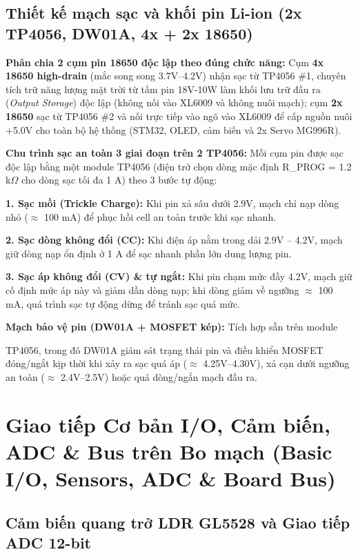 \documentclass[12pt,a4paper]{report}
\begin{document}
\subsection{Thiết kế mạch sạc và khối pin Li-ion (2x TP4056, DW01A, 4x + 2x 18650)}

\textbf{Phân chia 2 cụm pin 18650 độc lập theo đúng chức năng:} Cụm \textbf{4x 18650 high-drain} (mắc song song 3.7V--4.2V) nhận sạc từ TP4056 \#1, chuyên tích trữ năng lượng mặt trời từ tấm pin 18V-10W làm khối lưu trữ đầu ra (\textit{Output Storage}) độc lập (không nối vào XL6009 và không nuôi mạch); cụm \textbf{2x 18650} sạc từ TP4056 \#2 và nối trực tiếp vào ngõ vào XL6009 để cấp nguồn nuôi +5.0V cho toàn bộ hệ thống (STM32, OLED, cảm biến và 2x Servo MG996R).

\textbf{Chu trình sạc an toàn 3 giai đoạn trên 2\texttimes{} TP4056:} Mỗi cụm pin được sạc độc lập bằng một module TP4056 (điện trở chọn dòng mặc định R\_PROG = 1.2 k\ensuremath{\Omega} cho dòng sạc tối đa 1 A) theo 3 bước tự động:

\textbf{1. Sạc mồi (Trickle Charge):} Khi pin xả sâu dưới 2.9V, mạch chỉ nạp dòng nhỏ (\ensuremath{\approx} 100 mA) để phục hồi cell an toàn trước khi sạc nhanh.

\textbf{2. Sạc dòng không đổi (CC):} Khi điện áp nằm trong dải 2.9V -- 4.2V, mạch giữ dòng nạp ổn định ở 1 A để sạc nhanh phần lớn dung lượng pin.

\textbf{3. Sạc áp không đổi (CV) \& tự ngắt:} Khi pin chạm mức đầy 4.2V, mạch giữ cố định mức áp này và giảm dần dòng nạp; khi dòng giảm về ngưỡng \ensuremath{\approx} 100 mA, quá trình sạc tự động dừng để tránh sạc quá mức.

\textbf{Mạch bảo vệ pin (DW01A + MOSFET kép):} Tích hợp sẵn trên module

TP4056, trong đó DW01A giám sát trạng thái pin và điều khiển MOSFET đóng/ngắt kịp thời khi xảy ra sạc quá áp (\ensuremath{\approx} 4.25V--4.30V), xả cạn dưới ngưỡng an toàn (\ensuremath{\approx} 2.4V--2.5V) hoặc quá dòng/ngắn mạch đầu ra.

\section{Giao tiếp Cơ bản I/O, Cảm biến, ADC \& Bus trên Bo mạch (Basic I/O, Sensors, ADC \& Board Bus)}

\subsection{Cảm biến quang trở LDR GL5528 và Giao tiếp ADC 12-bit}
\end{document}
